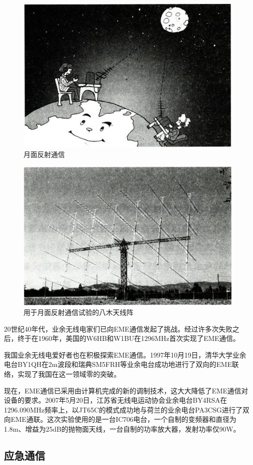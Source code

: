 \documentclass[12pt,UTF8]{ctexbook}
\begin{document}
\begin{figure}[htbp]
	\centering
	\includegraphics[width=0.7\linewidth]{10}
	\caption{月面反射通信}
	\label{fig:1}
\end{figure}

\begin{figure}[htbp]
	\centering
	\includegraphics[width=0.7\linewidth]{11}
	\caption{用于月面反射通信试验的八木天线阵}
	\label{fig:1}
\end{figure}

20世纪40年代，业余无线电家们已向EME通信发起了挑战。经过许多次失败之后，终于在1960年，美国的W6HB和W1BU在1296MHz首次实现了EME通信。

我国业余无线电爱好者也在积极探索EME通信。1997年10月19日，清华大学业余电台BY1QH在2m波段和瑞典SM5FRH等业余电台成功地进行了双向的EME联络，实现了我国在这一领域零的突破。

现在，EME通信已采用由计算机完成的新的调制技术，这大大降低了EME通信对设备的要求。2007年5月20日，江苏省无线电运动协会业余电台BY4RSA在1296.090MHz频率上，以JT65C的模式成功地与荷兰的业余电台PA3CSG进行了双向EME通联。这次实验使用的是一台IC706电台，一个自制的变频器和直径为1.8m、增益为25dB的抛物面天线，一台自制的功率放大器，发射功率仅90W。

\subsection{应急通信}
\end{document}

